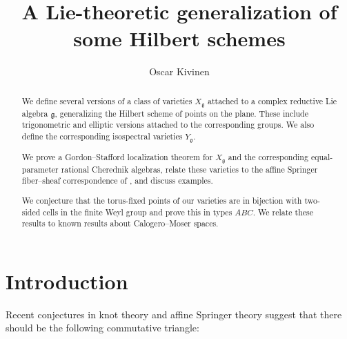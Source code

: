 \documentclass{amsart}
\numberwithin{equation}{section}
\theoremstyle{definition}
\DeclareMathOperator{\Hilb}{Hilb}
\newcommand{\fg}{\mathfrak{g}}
\newcommand{\C}{{\mathbb C}}
\begin{document}
\title{A Lie-theoretic generalization of some Hilbert schemes}
\author{Oscar Kivinen}
\address{Aalto University}
\begin{abstract}
    We define several versions of a class of varieties $X_{\fg}$ attached to a complex reductive Lie algebra $\fg$, generalizing the Hilbert scheme of points on the plane. These include trigonometric and elliptic versions attached to the corresponding groups. We also define the corresponding isospectral varieties $Y_{\fg}$.  
    
    We prove a Gordon--Stafford localization theorem for $X_\fg$ and the corresponding equal-parameter rational Cherednik algebras, relate these varieties to the affine Springer fiber--sheaf correspondence of \cite{GKO}, and discuss examples. 
    
    We conjecture that the torus-fixed points of our varieties are in bijection with two-sided cells in the finite Weyl group and prove this in types $ABC$. We relate these results to known results about Calogero--Moser spaces.

    
    
\end{abstract}
\maketitle 
\setcounter{tocdepth}{1}
\tableofcontents
\section{Introduction}
Recent conjectures in knot theory \cite{OR, GNR} and affine Springer theory \cite{GKO, KT} suggest that there should be the following commutative triangle:
\begin{center}
\begin{figure}
\label{fig:triangle}
\caption{}
\end{figure}
\end{center}
\end{document}
